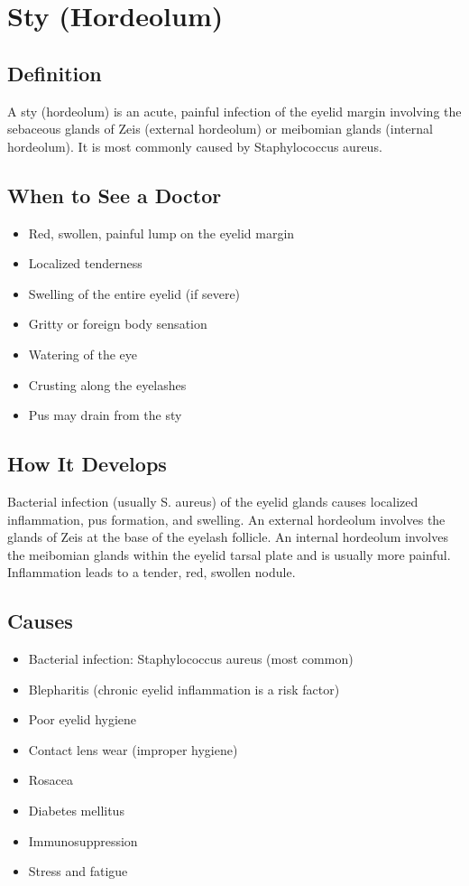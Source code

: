 \chapter{Sty (Hordeolum)}

\section*{Definition}
A sty (hordeolum) is an acute, painful infection of the eyelid margin involving the sebaceous glands of Zeis (external hordeolum) or meibomian glands (internal hordeolum). It is most commonly caused by Staphylococcus aureus.

\section*{When to See a Doctor}
\begin{itemize}
\item Red, swollen, painful lump on the eyelid margin
\item Localized tenderness
\item Swelling of the entire eyelid (if severe)
\item Gritty or foreign body sensation
\item Watering of the eye
\item Crusting along the eyelashes
\item Pus may drain from the sty
\end{itemize}

\section*{How It Develops}
Bacterial infection (usually S. aureus) of the eyelid glands causes localized inflammation, pus formation, and swelling. An external hordeolum involves the glands of Zeis at the base of the eyelash follicle. An internal hordeolum involves the meibomian glands within the eyelid tarsal plate and is usually more painful. Inflammation leads to a tender, red, swollen nodule.

\section*{Causes}
\begin{itemize}
\item Bacterial infection: Staphylococcus aureus (most common)
\item Blepharitis (chronic eyelid inflammation is a risk factor)
\item Poor eyelid hygiene
\item Contact lens wear (improper hygiene)
\item Rosacea
\item Diabetes mellitus
\item Immunosuppression
\item Stress and fatigue
\end{itemize}

